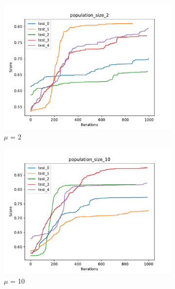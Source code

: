 \begin{figure}[H]
    \centering 
    \begin{subfigure}[b]{0.49\linewidth}
        \includegraphics[width=\linewidth]{img/population_size_2.pdf}
        \caption{$\mu$ = 2}
    \end{subfigure}
    \begin{subfigure}[b]{0.49\linewidth}
        \includegraphics[width=\linewidth]{img/population_size_10.pdf}
        \caption{$\mu$ = 10}
    \end{subfigure}
    \begin{subfigure}[b]{0.49\linewidth}

\end{subfigure}
\end{figure}
